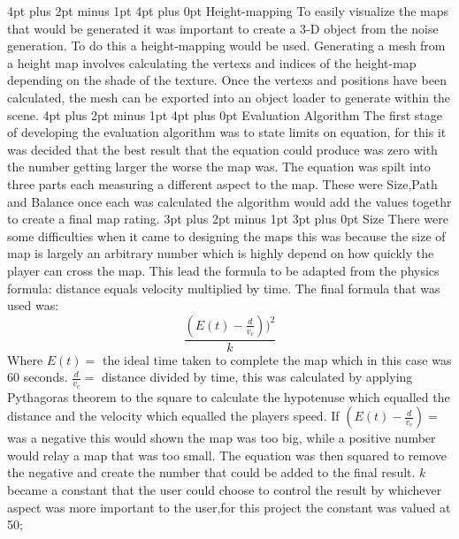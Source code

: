 \documentclass[12pt,a4paper,oneside]{book}
\makeatletter
\renewcommand\subsection{\@startsection {subsection}{1}{2mm} %
                               {3pt plus 2pt minus 1pt} %
                               {3pt plus 0pt} %
                               {\normalfont\bfseries}}
\renewcommand\section{\@startsection {section}{1}{0mm} %
                               {4pt plus 2pt minus 1pt} %
                               {4pt plus 0pt} %
                               {\bfseries}}
\makeatother
\begin{document}
\section{Height-mapping}
To easily visualize the maps that would be generated it was important to create a 3-D object from the noise generation. To do this a height-mapping would be used. Generating a mesh from a height map involves calculating the vertexs and indices of the  height-map depending on the shade of the texture. Once the vertexs and positions have been calculated,  the  mesh can be exported into an object loader to generate within the scene.  
\section{Evaluation Algorithm}
The first  stage of developing the evaluation algorithm was to state limits on equation, for this it was decided that the best result that the equation could produce was zero with the number getting larger the worse the map was. The equation was spilt into three parts each measuring a different aspect to the map. These were Size,Path and Balance once each was calculated the algorithm would add the values togethr to create a final map rating.   
\subsection{Size}
There were some difficulties when it came to designing the maps this was because the size of map is largely an arbitrary number which is highly depend on how quickly the player can cross the map. This lead the formula to be adapted from the physics formula: distance equals velocity multiplied by time. The final formula that was used was:  
\begin{equation}
\frac{(E(t)  - \frac{d}{v_c}))^2}{k}
\end{equation} 
Where  \(E(t) =\) the ideal time taken to complete the map which in this case was 60 seconds.
 \(\frac{d}{v_c}  =\) distance divided by time, this was calculated by applying Pythagoras theorem to the square to calculate the hypotenuse which equalled the distance and the velocity which equalled the players speed. If \((E(t)  - \frac{d}{v_c}) =\) was a negative this would shown the map was too big, while a positive number would relay a map that was too small. The equation was then squared to remove the negative and create the number that could be added to the final result. \(k \) became a constant that the user could choose to control the result by whichever aspect was more important to the user,for this project the constant was valued at 50;
\end{document}
